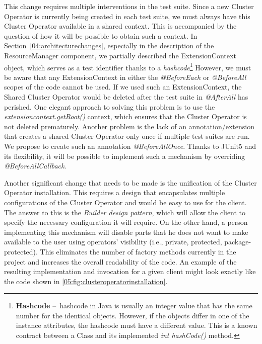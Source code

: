 This change requires multiple interventions in the test suite.
Since a new Cluster Operator is currently being created in each test suite, we must always have this Cluster Operator available in a shared context.
This is accompanied by the question of how it will be possible to obtain such a context.
In Section~\ref{04:architecturechanges}, especially in the description of the ResourceManager component, we partially described the ExtensionContext object, which serves as a test identifier thanks to a \emph{hashcode}\footnote{\textbf{Hashcode} \---\ hashcode in Java is usually an integer value that has the same number for the identical objects. However, if the objects differ in one of the instance attributes, the hashcode must have a different value. This is a known contract between a Class and its implemented \emph{int hashCode()} method.}  However, we must be aware that any ExtensionContext in either the \emph{@BeforeEach} or \emph{@BeforeAll} scopes of the code cannot be used. If we used such an ExtensionContext, the Shared Cluster Operator would be deleted after the test suite in \emph{@AfterAll} has perished. One elegant approach to solving this problem is to use the \emph{extensioncontext.getRoot()} context, which ensures that the Cluster Operator is not deleted prematurely.
Another problem is the lack of an annotation/extension that creates a shared Cluster Operator only once if multiple test suites are run.
We propose to create such an annotation \emph{@BeforeAllOnce}.
Thanks to JUnit5 and its flexibility, it will be possible to implement such a mechanism by overriding \emph{@BeforeAllCallback}.

Another significant change that needs to be made is the unification of the Cluster Operator installation.
This requires a design that encapsulates multiple configurations of the Cluster Operator and would be easy to use for the client.
The answer to this is the \emph{Builder design pattern}, which will allow the client to specify the necessary configuration it will require.
On the other hand, a person implementing this mechanism will disable parts that he does not want to make available to the user using operators' visibility (i.e., private, protected, package-protected).
This eliminates the number of factory methods currently in the project and increases the overall readability of the code.
An example of the resulting implementation and invocation for a given client might look exactly like the code shown in \ref{05:fig:clusteroperatorinstallation}.

